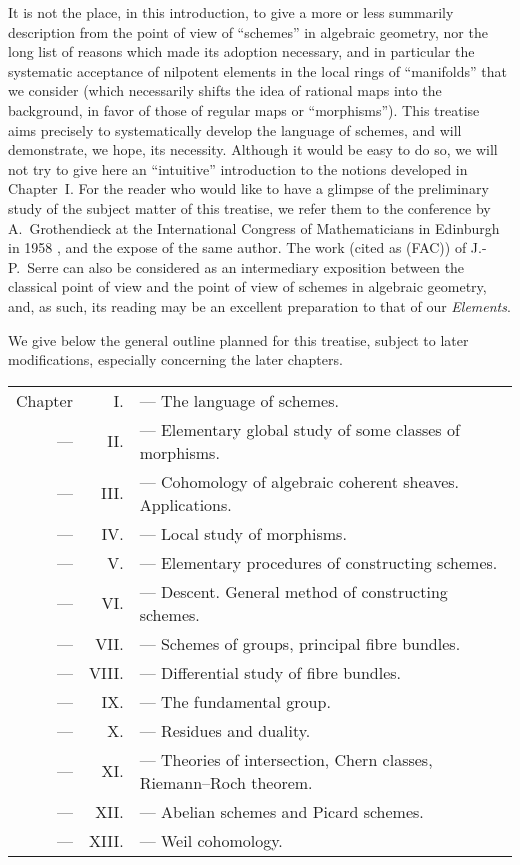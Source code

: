It is not the place, in this introduction, to give a more or less summarily
description from the point of view of ``schemes'' in algebraic geometry, nor the
long list of reasons which made its adoption necessary, and in particular the
systematic acceptance of nilpotent elements in the local rings of ``manifolds''
that we consider (which necessarily shifts the idea of rational maps into
the background, in favor of those of regular maps or ``morphisms''). This
treatise aims precisely to systematically develop the language of schemes, and
will demonstrate, we hope, its necessity. Although it would be easy to do so,
we will not try to give here an ``intuitive'' introduction to the
notions developed in Chapter~I. For the reader who would like to have a glimpse
of the preliminary study of the subject matter of this treatise, we refer them
to the conference by A.~Grothendieck at the International Congress of
Mathematicians in Edinburgh in 1958 \cite{I-7}, and the expose \cite{I-8} of the
same author. The work \cite{I-14} (cited as (FAC)) of J.-P.~Serre can also be
considered as an intermediary exposition between the classical point of view and
the point of view of schemes in algebraic geometry, and, as such, its reading
may be an excellent preparation to that of our \emph{Elements}.

\sectionbreak

We give below the general outline planned for this treatise, subject to later
modifications, especially concerning the later chapters.

\begin{tabular}{rrl}
Chapter & I. & --- The language of schemes.\\
--- & II. & --- Elementary global study of some classes of morphisms.\\
--- & III. & --- Cohomology of algebraic coherent sheaves. Applications.\\
--- & IV. & --- Local study of morphisms.\\
--- & V. & --- Elementary procedures of constructing schemes.\\
--- & VI. & --- Descent. General method of constructing schemes.\\
--- & VII. & --- Schemes of groups, principal fibre bundles.\\
--- & VIII. & --- Differential study of fibre bundles.\\
--- & IX. & --- The fundamental group.\\
--- & X. & --- Residues and duality.\\
--- & XI. & --- Theories of intersection, Chern classes,
Riemann--Roch theorem.\\
--- & XII. & --- Abelian schemes and Picard schemes.\\
--- & XIII. & --- Weil cohomology.
\end{tabular}\\

